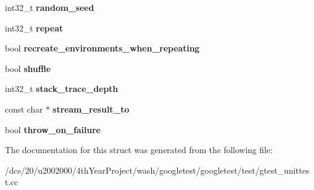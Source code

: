 \begin{DoxyCompactItemize}
int32\+\_\+t {\bfseries random\+\_\+seed}
\item 
\mbox{\label{structtesting_1_1Flags_a396ed200e54cd32883504b668eeb5632}} 
int32\+\_\+t {\bfseries repeat}
\item 
\mbox{\label{structtesting_1_1Flags_a0cd248c27f2747daf39af989c2f09eeb}} 
bool {\bfseries recreate\+\_\+environments\+\_\+when\+\_\+repeating}
\item 
\mbox{\label{structtesting_1_1Flags_a51c689e47e0f55c16116ac2a1d3b05d6}} 
bool {\bfseries shuffle}
\item 
\mbox{\label{structtesting_1_1Flags_aedd60cacac5202d70bdbca9227e77c7f}} 
int32\+\_\+t {\bfseries stack\+\_\+trace\+\_\+depth}
\item 
\mbox{\label{structtesting_1_1Flags_ab09849fd3e095d5628dec65ec4dce9e1}} 
const char $\ast$ {\bfseries stream\+\_\+result\+\_\+to}
\item 
\mbox{\label{structtesting_1_1Flags_ab8e7d21e31e641efe47b8050759e001a}} 
bool {\bfseries throw\+\_\+on\+\_\+failure}
\end{DoxyCompactItemize}


The documentation for this struct was generated from the following file\+:\begin{DoxyCompactItemize}
\item 
/dcs/20/u2002000/4th\+Year\+Project/wash/googletest/googletest/test/gtest\+\_\+unittest.\+cc\end{DoxyCompactItemize}
